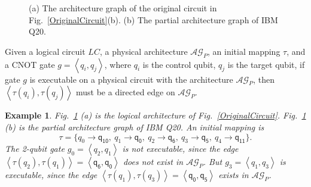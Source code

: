 \documentclass[journal]{IEEEtran}
\newtheorem{example}{Example}
\begin{document}
\begin{figure}
\begin{center}
{
			}
		\end{center}
		
		\caption{(a) The architecture graph of the original circuit in Fig.~\ref{OriginalCircuit}(b). (b) The partial architecture graph of IBM Q20.}
		\label{LAGPAG}
	\end{figure}
	
	
	Given a logical circuit $LC$, a physical architecture $\mathcal{AG}_{P}$, an initial mapping $\tau$, and a CNOT gate $g=\left \langle \textit{q}_\textit{i},\textit{q}_\textit{j}\right \rangle $, where $\textit{q}_\textit{i}$ is the control qubit, $\textit{q}_\textit{j}$ is the target qubit,
	if gate $g$ is executable on a physical circuit with the architecture $\mathcal{AG}_{P}$, then
	$\left \langle\tau(\textit{q}_\textit{i}),\tau(\textit{q}_\textit{j})\right \rangle $ 
	must be a directed edge on $\mathcal{AG}_{P}$.
	
	
	\begin{example}
		Fig.~\ref{LAGPAG} (a) is the logical architecture of Fig.~\ref{OriginalCircuit}. 
		Fig.~\ref{LAGPAG} (b) is the partial architecture graph of IBM Q20. An initial mapping is 
		$$\tau=\{\textit{q}_\textit{0}\rightarrow  \textsf{q}_{\textsf{10}},\ \textit{q}_\textit{1}\rightarrow \textsf{q}_{\textsf{0}},\ 
		\textit{q}_\textit{2}\rightarrow  \textsf{q}_{\textsf{6}},\ \textit{q}_\textit{3}\rightarrow  \textsf{q}_{\textsf{5}},\ \textit{q}_\textit{4}\rightarrow  \textsf{q}_{\textsf{11}}\} .$$
		The 2-qubit gate	$g_{0}=\left \langle \textit{q}_\textit{2},\textit{q}_\textit{1}\right \rangle $ is not executable, since the edge $\left \langle \tau(\textit{q}_\textit{2}),\tau(\textit{q}_\textit{1})\right \rangle =\left \langle \textsf{q}_{\textsf{6}},\textsf{q}_{\textsf{0}}\right \rangle $ does not exist in $\mathcal{AG}_{P}$.
		But $g_{3}=\left \langle \textit{q}_\textit{1},\textit{q}_\textit{3}\right \rangle $ is executable, since 
		the edge $\left \langle \tau(\textit{q}_\textit{1}),\tau(\textit{q}_\textit{3})\right \rangle =\left \langle \textsf{q}_{\textsf{0}},\textsf{q}_{\textsf{5}}\right \rangle $  exists in $\mathcal{AG}_{P}$.
	\end{example}
	
\end{document}
